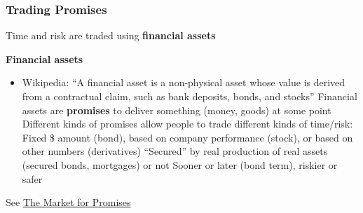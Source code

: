 \begin{frame}
\frametitle{Trading Promises}

Time and risk are traded using \textbf{financial assets}\pause

\vspace{2ex}

\textbf{Financial assets}
\begin{itemize}
\item Wikipedia: ``A financial asset is a non-physical asset whose value is derived from a contractual claim, such as bank deposits, bonds, and stocks''
\m Financial assets are \textbf{promises} to deliver something (money, goods) at some point \pause
\m Different kinds of promises allow people to trade different kinds of time/risk:
\bi \pause
\m Fixed \$ amount (bond), based on company performance (stock), or based on other numbers (derivatives) \pause
\m ``Secured'' by real production of real assets (secured bonds, mortgages) or not \pause
\m Sooner or later (bond term), riskier or safer \pause
\ei
\end{itemize}

\vspace{2ex}

See \href{https://anthonyleezhang.substack.com/p/the-market-for-promises}{The Market for Promises}

\end{frame}